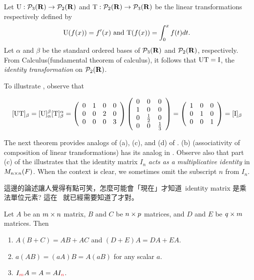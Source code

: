 \begin{example} \label{example 2.3.2}
Let \(\mathrm{U}: \mathcal{P}_3(\mathbf{R}) \to \mathcal{P}_2(\mathbf{R})\) and \(\mathrm{T}: \mathcal{P}_2(\mathbf{R}) \to \mathcal{P}_3(\mathbf{R})\) be the linear transformations respectively defined by
\[
    \mathrm{U}(f(x)) = f'(x) \text{ and } \mathrm{T}(f(x)) = \int_0^x f(t) dt.
\]
Let \(\alpha\) and \(\beta\) be the standard ordered bases of \(\mathcal{P}_3(\mathbf{R})\) and \(\mathcal{P}_2(\mathbf{R})\), respectively.
From Calculus(fundamental theorem of calculus), it follows that \(\mathrm{U}\mathrm{T} = \mathrm{I}\), the \emph{identity transformation} on \(\mathcal{P}_2(\mathbf{R})\).

To illustrate , observe that

\[
    [\mathrm{U}\mathrm{T}]_{\beta} = [\mathrm{U}]_{\alpha}^{\beta}[\mathrm{T}]_{\beta}^{\alpha}
    =\left(\begin{array}{cccc}
        0 & 1 & 0 & 0 \\
        0 & 0 & 2 & 0 \\
        0 & 0 & 0 & 3
    \end{array}\right)
    \left(\begin{array}{ccc}
        0 & 0 & 0 \\
        1 & 0 & 0 \\
        0 & \frac{1}{2} & 0 \\
        0 & 0 & \frac{1}{3}
    \end{array}\right)
    =\left(\begin{array}{ccc}
        1 & 0 & 0 \\
        0 & 1 & 0 \\
        0 & 0 & 1
    \end{array}\right)
    =[\mathrm{I}]_{\beta}
\]
\end{example}

The next theorem provides analogs of (a), (c), and (d) of .
(b) (associativity of composition of linear transformations) has its analog in .
Observe also that part (c) of the  illustrates that the identity matrix \(I_n\) \emph{acts as a multiplicative identity} in \(M_{n \times n}(F)\).
When the context is clear, we sometimes omit the subscript \(n\) from \(I_n\).

\begin{note}
這邊的論述讓人覺得有點可笑，怎麼可能會「現在」才知道\ identity matrix 是乘法單位元素? 這在\  就已經需要知道了才對。
\end{note}

\begin{theorem} \label{thm 2.12}
Let \(A\) be an \(m \times n\) matrix, \(B\) and \(C\) be \(n \times p\) matrices, and \(D\) and \(E\) be \(q \times m\) matrices.
Then
\begin{enumerate}
\item \(A(B + C) = AB + AC\) and \((D + E)A = DA + EA\).
\item \(a(AB) = (aA)B = A(aB)\) for any scalar \(a\).
\item \(I_{\RED{m}}A = A = AI_{\RED{n}}\).
\end{enumerate}
\end{theorem}

